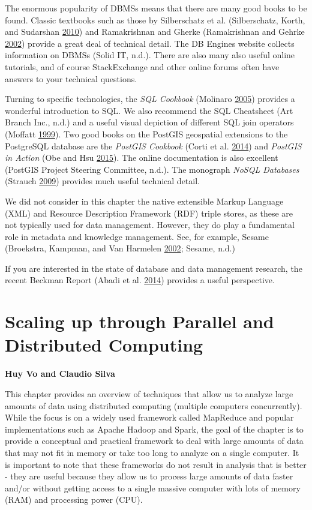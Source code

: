 \documentclass[]{krantz}
\begin{document}
The enormous popularity of DBMSs means that there are many good books to
be found. Classic textbooks such as those by Silberschatz et al.
(Silberschatz, Korth, and Sudarshan
\protect\hyperlink{ref-silberschatz2010database}{2010}) and Ramakrishnan
and Gherke (Ramakrishnan and Gehrke
\protect\hyperlink{ref-ramakrishnan2000database}{2002}) provide a great
deal of technical detail. The DB Engines website collects information on
DBMSs (Solid IT, n.d.). There are also many also useful online
tutorials, and of course StackExchange and other online forums often
have answers to your technical questions.

Turning to specific technologies, the \emph{SQL Cookbook} (Molinaro
\protect\hyperlink{ref-SQLCookbook}{2005}) provides a wonderful
introduction to SQL. We also recommend the SQL Cheatsheet (Art Branch
Inc., n.d.) and a useful visual depiction of different SQL join
operators (Moffatt \protect\hyperlink{ref-vizjoins}{1999}). Two good
books on the PostGIS geospatial extensions to the PostgreSQL database
are the \emph{PostGIS Cookbook} (Corti et al.
\protect\hyperlink{ref-PostGISCookbook}{2014}) and \emph{PostGIS in
Action} (Obe and Hsu \protect\hyperlink{ref-PostGISInAction}{2015}). The
online documentation is also excellent (PostGIS Project Steering
Committee, n.d.). The monograph \emph{NoSQL Databases} (Strauch
\protect\hyperlink{ref-NoSQLdatabases}{2009}) provides much useful
technical detail.

We did not consider in this chapter the native extensible Markup
Language (XML) and Resource Description Framework (RDF) triple stores,
as these are not typically used for data management. However, they do
play a fundamental role in metadata and knowledge management. See, for
example, Sesame (Broekstra, Kampman, and Van Harmelen
\protect\hyperlink{ref-broekstra2002sesame}{2002}; Sesame, n.d.)

If you are interested in the state of database and data management
research, the recent Beckman Report (Abadi et al.
\protect\hyperlink{ref-abadi2014beckman}{2014}) provides a useful
perspective.

\hypertarget{chap:parallel}{\chapter{Scaling up through Parallel and
Distributed Computing}\label{chap:parallel}}

\textbf{Huy Vo and Claudio Silva}

This chapter provides an overview of techniques that allow us to analyze
large amounts of data using distributed computing (multiple computers
concurrently). While the focus is on a widely used framework called
MapReduce and popular implementations such as Apache Hadoop and Spark,
the goal of the chapter is to provide a conceptual and practical
framework to deal with large amounts of data that may not fit in memory
or take too long to analyze on a single computer. It is important to
note that these frameworks do not result in analysis that is better -
they are useful because they allow us to process large amounts of data
faster and/or without getting access to a single massive computer with
lots of memory (RAM) and processing power (CPU).
\end{document}
